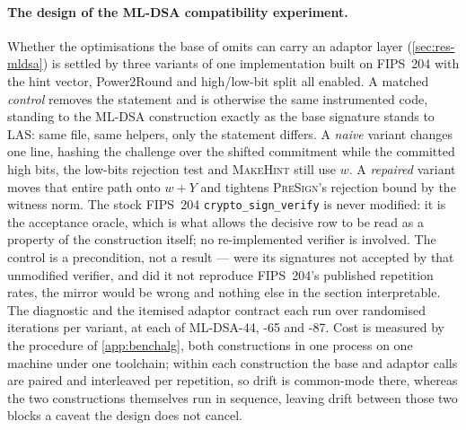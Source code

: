 \paragraph{The design of the ML-DSA compatibility experiment.}
Whether the optimisations the base of \cite{esgin2020post} omits can carry an adaptor layer
(\cref{sec:res-mldsa}) is settled by three variants of one implementation built on
FIPS~204 \cite{1274601} with the hint vector, Power2Round and high/low-bit split all
enabled. A matched \emph{control} removes the statement and is otherwise the same
instrumented code, standing to the ML-DSA construction exactly as the base signature stands
to LAS: same file, same helpers, only the statement differs. A \emph{naive} variant changes
one line, hashing the challenge over the shifted commitment while the committed high bits,
the low-bits rejection test and \textsc{MakeHint} still use $w$. A \emph{repaired} variant
moves that entire path onto $w+Y$ and tightens \textsc{PreSign}'s rejection bound by the
witness norm. The stock FIPS~204 \texttt{crypto\_sign\_verify} is never modified: it is the
acceptance oracle, which is what allows the decisive row to be read as a property of the
construction itself; no re-implemented verifier is involved. The control is a precondition, not a result --- were its signatures not accepted by that unmodified verifier, and did it
not reproduce FIPS~204's published repetition rates, the mirror would be wrong and nothing
else in the section interpretable. The diagnostic and the itemised adaptor contract each run
over \mldsaIters{} randomised iterations per variant, at each of ML-DSA-44, -65 and -87.
Cost is measured by the procedure of \cref{app:benchalg}, both constructions in one process
on one machine under one toolchain; within each construction the base and adaptor calls are
paired and interleaved per repetition, so drift is common-mode there, whereas the two
constructions themselves run in sequence, leaving drift between those two blocks a caveat the design does not cancel.

